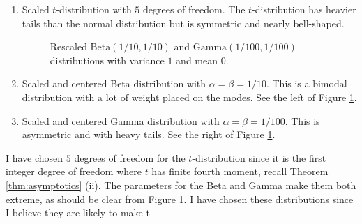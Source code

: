 \documentclass{article}
\theoremstyle{plain}
\theoremstyle{plain}
\theoremstyle{definition}
\theoremstyle{remark}
\theoremstyle{definition}
\theoremstyle{plain}
\theoremstyle{plain}
\theoremstyle{definition}
\begin{document}
\begin{enumerate}
\item Scaled $t$-distribution with $5$ degrees of freedom. The $t$-distribution
has heavier tails than the normal distribution but is symmetric and nearly bell-shaped. 
\begin{figure}
	\centering     %
	\caption{Rescaled $\textrm{Beta}(1/10, 1/10)$ and $\textrm{Gamma}(1/100, 1/100)$ distributions with variance $1$ and mean $0$.}
	\label{fig::distributions}
\end{figure}

\item Scaled and centered Beta distribution with $\alpha=\beta=1/10$. This is a bimodal distribution with a lot of weight placed on the modes. See the left of Figure \ref{fig::distributions}.
\item Scaled and centered Gamma distribution with $\alpha=\beta=1/100$. This is asymmetric and with heavy tails. See the right of Figure \ref{fig::distributions}.
\end{enumerate}

I have chosen $5$ degrees of freedom for the $t$-distribution since it is the first integer degree of freedom where $t$ has finite fourth moment, recall Theorem \ref{thm:asymptotics} (ii). The parameters for the Beta and Gamma make them both extreme, as should be clear from Figure \ref{fig::distributions}. I have chosen these distributions since I believe they are likely to make t
\end{document}
